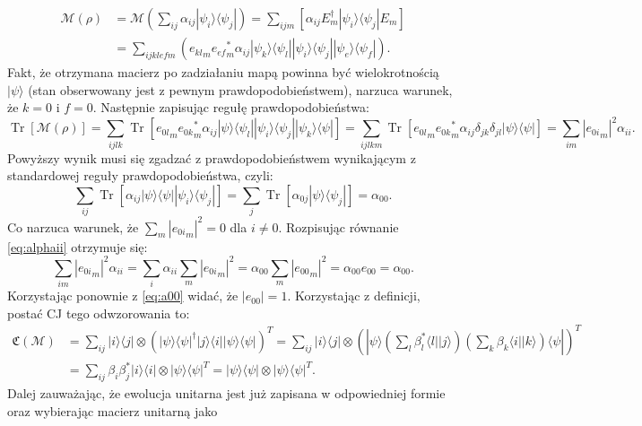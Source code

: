 \documentclass[10pt]{article} %
\DeclareMathOperator{\Trs}{Tr}
\newcommand{\Ket}[1]{|#1\rangle}
\newcommand{\Bra}[1]{\langle#1|}
\newcommand{\KP}{\Ket{\psi}}
\newcommand{\BP}{\Bra{\psi}}
\newcommand{\MCJ}{\mathfrak{C}}
\begin{document}
\begin{equation}
\begin{split}
\mathcal{M}(\rho) &= \mathcal{M}\left(\sum_{ij} \alpha_{ij} \Ket{\psi_i}\Bra{\psi_j}\right) = \sum_{ijm} \left[ \alpha_{ij} E^\dag_m \Ket{\psi_i}\Bra{\psi_j}E_m\right]\\
&= \sum_{ijklefm} \left( {e_{kl}}_m {e_{ef}}_m^*\alpha_{ij} \Ket{\psi_k}\Bra{\psi_l} \Ket{\psi_i}\Bra{\psi_j} \Ket{\psi_e}\Bra{\psi_f}\right). 
\end{split}
\end{equation}
Fakt, że otrzymana macierz po zadziałaniu mapą powinna być wielokrotnością $\Ket{\psi}$ (stan obserwowany jest z pewnym prawdopodobieństwem), narzuca warunek, że $k = 0$ i $f = 0$. Następnie zapisując regułę prawdopodobieństwa:
\begin{equation}
\label{eq:alphaii}
\Trs\left[ \mathcal{M}(\rho) \right] = \sum_{ijlk} \Trs \left[ {e_{0l}}_m{e_{0k}}_m^*\alpha_{ij} \Ket{\psi}\Bra{\psi_l} \Ket{\psi_i}\Bra{\psi_j} \Ket{\psi_k}\Bra{\psi}\right] =
\sum_{ijlkm} \Trs \left [ {e_{0l}}_m{e_{0k}}_m^*\alpha_{ij}\delta_{jk}\delta_{jl} \Ket{\psi}\Bra{\psi} \right] = \sum_{im} |{e_{0i}}_m|^2 \alpha_{ii}.
\end{equation} 
Powyższy wynik musi się zgadzać z prawdopodobieństwem wynikającym z standardowej reguły prawdopodobieństwa, czyli:
\begin{equation}
\label{eq:a00}
\sum_{ij} \Trs \left[ \alpha_{ij} \Ket{\psi}\Bra{\psi} \Ket{\psi_i}\Bra{\psi_j}\right] = \sum_{j} \Trs \left[ \alpha_{0j} \Ket{\psi}\Bra{\psi_j} \right] = \alpha_{00}.
\end{equation}
Co narzuca warunek, że $\sum_m |{e_{0i}}_m|^2 = 0$  dla $i \neq 0$. Rozpisując równanie \eqref{eq:alphaii} otrzymuje się:
\begin{equation}
\sum_{im} |{e_{0i}}_m|^2 \alpha_{ii} = \sum_i \alpha_{ii} \sum_m  |{e_{0i}}_m|^2 = \alpha_{00} \sum_m |{e_{00}}_m|^2 = \alpha_{00} e_{00} = \alpha_{00}.
\end{equation}
Korzystając ponownie z \eqref{eq:a00} widać, że $|e_{00}| = 1$.
Korzystając z definicji, postać CJ tego odwzorowania to:
\begin{equation}
\begin{split}
\MCJ(\mathcal{M}) &= \sum_{ij} \Ket{i}\Bra{j} \otimes (\Ket{\psi}\Bra{\psi}^\dag \Ket{j}\Bra{i} \Ket{\psi}\Bra{\psi})^T = \sum_{ij}\Ket{i}\Bra{j}  \otimes (\Ket{\psi}\left(\sum_l \beta_{l}^* \Bra{l}\Ket{j}\right)\left(\sum_k\beta_k\Bra{i}\Ket{k}\right)\Bra{\psi})^T \\&=  \sum_{ij} \beta_i \beta_j^* \Ket{i}\Bra{i} \otimes \KP\BP^T = \KP\BP \otimes \KP\BP^T.
\end{split}
\end{equation} Dalej zauważając, że ewolucja unitarna jest już zapisana w odpowiedniej formie oraz wybierając macierz unitarną jako
\end{document}

